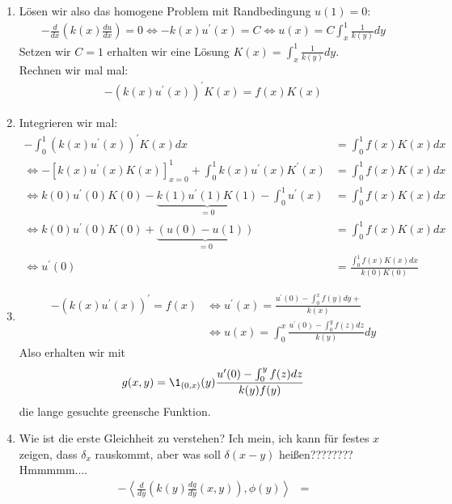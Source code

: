 \begin{solution}

\phantom{}
\begin{enumerate}[label = (\roman*)]
  \item Lösen wir also das homogene Problem mit Randbedingung $u(1) = 0$:
  \begin{align*}
    -\frac{d}{dx}\left(k(x)\frac{du}{dx}\right) = 0
    \iff -k(x)u^{\prime}(x) = C
    \iff u(x) = C\int_x^1 \frac{1}{k(y)} dy
  \end{align*}
  Setzen wir $C = 1$ erhalten wir eine Lösung $K(x) = \int_x^1 \frac{1}{k(y)}dy$. \\
  Rechnen wir mal mal:
  \begin{align*}
    -(k(x)u^{\prime}(x))^{\prime}K(x) = f(x)K(x)
  \end{align*}
  \item
  Integrieren wir mal:
  \begin{align*}
    -\int_0^1(k(x)u^{\prime}(x))^{\prime}K(x)dx
    &= \int_0^1f(x)K(x)dx \\
    \iff -[k(x)u^{\prime}(x)K(x)]_{x=0}^1 + \int_0^1k(x)u^{\prime}(x)K^{\prime}(x)
    &= \int_0^1f(x)K(x)dx \\
    \iff k(0)u^{\prime}(0)K(0) - \underbrace{k(1)u^{\prime}(1)K(1)}_{=0} - \int_0^1u^{\prime}(x)
    &= \int_0^1f(x)K(x)dx \\
    \iff k(0)u^{\prime}(0)K(0) + \underbrace{(u(0) - u(1))}_{=0}
    &= \int_0^1f(x)K(x)dx \\
    \iff u^{\prime}(0) &= \frac{\int_0^1f(x)K(x)dx}{k(0)K(0)}
  \end{align*}
  \item
  \begin{align*}
    -(k(x)u^{\prime}(x))^{\prime} = f(x) &\iff u^{\prime}(x)
    = \frac{u^{\prime}(0) - \int_0^x f(y)dy + }{k(x)} \\
    &\iff u(x) = \int_0^x \frac{u^{\prime}(0) - \int_0^y f(z) dz}{k(y)}dy
  \end{align*}
  Also erhalten wir mit
  \begin{align*}
    g(x,y) = \1_{(0,x)}(y)\frac{u^{\prime}(0) - \int_0^y f(z) dz}{k(y)f(y)}
  \end{align*}
  die lange gesuchte greensche Funktion.
  \item Wie ist die erste Gleichheit zu verstehen? Ich mein, ich kann für festes $x$
  zeigen, dass $\delta_x$ rauskommt, aber was soll $\delta(x-y)$ heißen????????Hmmmmm....
  \begin{align*}
    -\left\langle\frac{d}{dy}\left(k(y)\frac{dg}{dy}(x,y)\right), \phi(y) \right\rangle &=

\end{align*}
\end{enumerate}
\end{solution}
